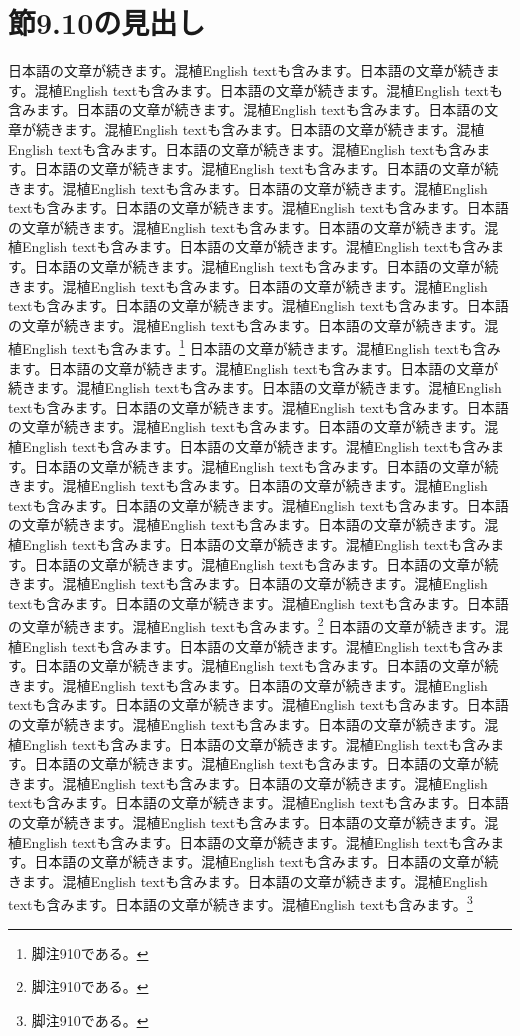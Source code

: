 \documentclass[pdflatex,book]{jlreq}
\begin{document}
\section{節9.10の見出し}
日本語の文章が続きます。混植English textも含みます。日本語の文章が続きます。混植English textも含みます。日本語の文章が続きます。混植English textも含みます。日本語の文章が続きます。混植English textも含みます。日本語の文章が続きます。混植English textも含みます。日本語の文章が続きます。混植English textも含みます。日本語の文章が続きます。混植English textも含みます。日本語の文章が続きます。混植English textも含みます。日本語の文章が続きます。混植English textも含みます。日本語の文章が続きます。混植English textも含みます。日本語の文章が続きます。混植English textも含みます。日本語の文章が続きます。混植English textも含みます。日本語の文章が続きます。混植English textも含みます。日本語の文章が続きます。混植English textも含みます。日本語の文章が続きます。混植English textも含みます。日本語の文章が続きます。混植English textも含みます。日本語の文章が続きます。混植English textも含みます。日本語の文章が続きます。混植English textも含みます。日本語の文章が続きます。混植English textも含みます。日本語の文章が続きます。混植English textも含みます。\footnote{脚注910である。}
日本語の文章が続きます。混植English textも含みます。日本語の文章が続きます。混植English textも含みます。日本語の文章が続きます。混植English textも含みます。日本語の文章が続きます。混植English textも含みます。日本語の文章が続きます。混植English textも含みます。日本語の文章が続きます。混植English textも含みます。日本語の文章が続きます。混植English textも含みます。日本語の文章が続きます。混植English textも含みます。日本語の文章が続きます。混植English textも含みます。日本語の文章が続きます。混植English textも含みます。日本語の文章が続きます。混植English textも含みます。日本語の文章が続きます。混植English textも含みます。日本語の文章が続きます。混植English textも含みます。日本語の文章が続きます。混植English textも含みます。日本語の文章が続きます。混植English textも含みます。日本語の文章が続きます。混植English textも含みます。日本語の文章が続きます。混植English textも含みます。日本語の文章が続きます。混植English textも含みます。日本語の文章が続きます。混植English textも含みます。日本語の文章が続きます。混植English textも含みます。\footnote{脚注910である。}
日本語の文章が続きます。混植English textも含みます。日本語の文章が続きます。混植English textも含みます。日本語の文章が続きます。混植English textも含みます。日本語の文章が続きます。混植English textも含みます。日本語の文章が続きます。混植English textも含みます。日本語の文章が続きます。混植English textも含みます。日本語の文章が続きます。混植English textも含みます。日本語の文章が続きます。混植English textも含みます。日本語の文章が続きます。混植English textも含みます。日本語の文章が続きます。混植English textも含みます。日本語の文章が続きます。混植English textも含みます。日本語の文章が続きます。混植English textも含みます。日本語の文章が続きます。混植English textも含みます。日本語の文章が続きます。混植English textも含みます。日本語の文章が続きます。混植English textも含みます。日本語の文章が続きます。混植English textも含みます。日本語の文章が続きます。混植English textも含みます。日本語の文章が続きます。混植English textも含みます。日本語の文章が続きます。混植English textも含みます。日本語の文章が続きます。混植English textも含みます。\footnote{脚注910である。}
\end{document}
